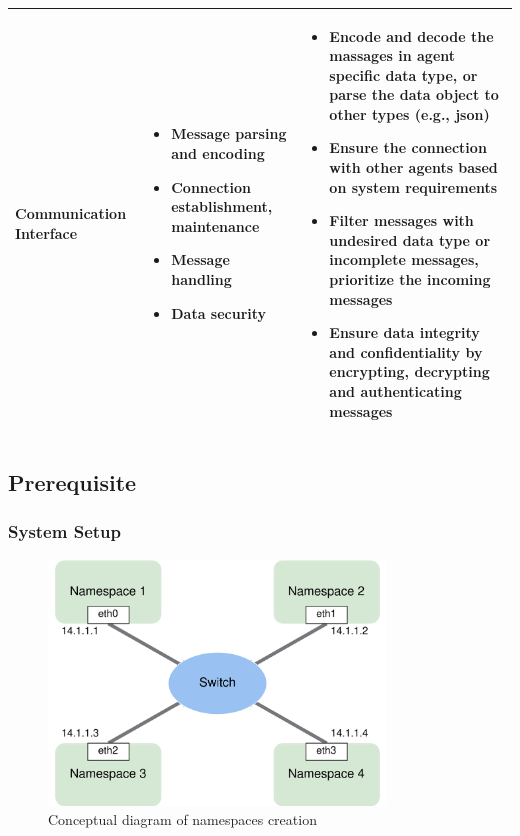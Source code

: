 \begin{table}[p]
\begin{tabularx}{\textwidth}{|Y|Z|W|}
    Communication Interface & 
    \vspace{-15pt}
    \begin{itemize}
        \item Message parsing and encoding
        \item Connection establishment, maintenance
        \item Message handling 
        \item Data security
    \end{itemize}
    & 
    \vspace{-15pt}
    \begin{itemize}
        \item Encode and decode the massages in agent specific data type, or  parse the data object to other types (e.g., json)
        \item Ensure the connection with other agents based on system requirements
        \item Filter messages with undesired data type or incomplete messages, prioritize the incoming messages
        \item Ensure data integrity and confidentiality by encrypting, decrypting and authenticating messages
    \end{itemize} \\
    \hline
    \end{tabularx}
    \end{table}


\subsection{Prerequisite}
\subsubsection{System Setup}
 
\begin{figure}[htbp]
\includegraphics[width=0.8\textwidth]{figures/NamespaceConceptual.png}
\centering
\caption{Conceptual diagram of namespaces creation
\label{fig: NSConceptual}}
\end{figure}


